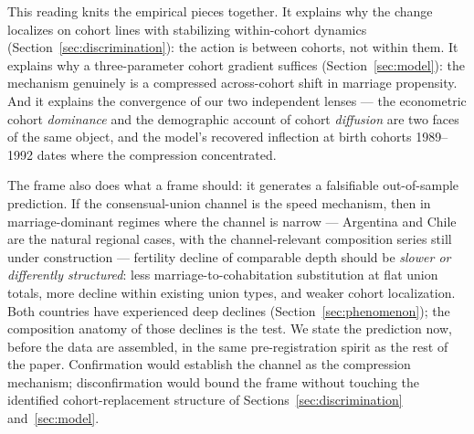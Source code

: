 This reading knits the empirical pieces together. It explains why the change
localizes on cohort lines with stabilizing within-cohort dynamics
(Section~\ref{sec:discrimination}): the action is between cohorts, not within
them. It explains why a three-parameter cohort gradient suffices
(Section~\ref{sec:model}): the mechanism genuinely is a compressed
across-cohort shift in marriage propensity. And it explains the convergence of
our two independent lenses --- the econometric cohort \emph{dominance} and the
demographic account of cohort \emph{diffusion} are two faces of the same
object, and the model's recovered inflection at birth cohorts 1989--1992 dates
where the compression concentrated.

The frame also does what a frame should: it generates a falsifiable
out-of-sample prediction. If the consensual-union channel is the speed
mechanism, then in marriage-dominant regimes where the channel is narrow ---
Argentina and Chile are the natural regional cases, with the channel-relevant
composition series still under construction --- fertility decline of comparable
depth should be \emph{slower or differently structured}: less
marriage-to-cohabitation substitution at flat union totals, more decline within
existing union types, and weaker cohort localization. Both countries have
experienced deep declines (Section~\ref{sec:phenomenon}); the composition
anatomy of those declines is the test. We state the prediction now, before the
data are assembled, in the same pre-registration spirit as the rest of the
paper. Confirmation would establish the channel as the compression mechanism;
disconfirmation would bound the frame without touching the identified
cohort-replacement structure of Sections~\ref{sec:discrimination}
and~\ref{sec:model}.
